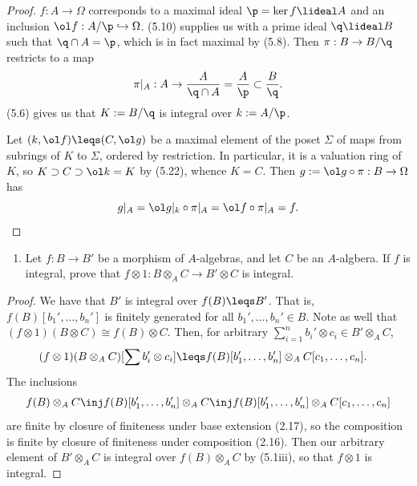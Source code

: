 \documentclass[12pt]{amsart}
\begin{document}
\begin{proof}
  $f:A\to \Omega$ corresponds to a maximal ideal $\p=\ker f\lideal A$ and an inclusion $\ol f:A/\p\hookrightarrow \Omega$.
  (5.10) supplies us with a prime ideal $\q\lideal B$ such that $\q\cap A= \p$, which is in fact maximal by (5.8).
  Then $\pi:B\to B/\q$ restricts to a map 
  \[
    \pi|_A:A\to \frac{A}{\q\cap A}=\frac{A}\p\subset \frac{B}\q.
  \] 
  (5.6) gives us that $K:=B/\q$ is integral over $k:=A/\p$.

  Let $(k,\ol f)\leqs (C,\ol g)$ be a maximal element of the poset $\Sigma$ of maps from subrings of $K$ to $\Sigma$, ordered by restriction.
  In particular, it is a valuation ring of $K$, so $K\supset C\supset \ol k=K$ by (5.22), whence $K=C$.
  Then $g:=\ol g\circ \pi:B\to \Omega$ has 
  \[
    g|_A=\ol g|_k\circ \pi|_A= \ol f\circ \pi|_A=f.
  \]
\end{proof}

\begin{enumerate}
	\item[5.3.] {
      Let $f:B\to B'$ be a morphism of $A$-algebras, and let $C$ be an $A$-algbera.
      If $f$ is integral, prove that $f\otimes 1:B\otimes_A C\to B'\otimes C$ is integral.
    }
\end{enumerate}

\begin{proof}
  We have that $B'$ is integral over $f(B)\leqs B'$.
  That is, $f(B)[b_1',\ldots, b_n']$ is finitely generated for all $b_1',\ldots, b_n'\in B$.
  Note as well that $(f\otimes 1)(B\otimes C)\cong f(B)\otimes C$.
  Then, for arbitrary $\sum_{i=1}^n b_i'\otimes c_i\in B'\otimes_A C$,
  \begin{align*}
    (f\otimes 1)(B\otimes_A C)[\sum b_i'\otimes c_i]
    &\leqs f(B)[b_1',\ldots, b_n']\otimes_A C[c_1,\ldots, c_n].
  \end{align*}
  The inclusions
  \begin{align*}
    f(B)\otimes_A C\inj f(B)[b_1',\ldots, b_n'] \otimes_A C\inj f(B)[b_1',\ldots, b_n']\otimes_A C[c_1,\ldots, c_n]
  \end{align*}
  are finite by closure of finiteness under base extension (2.17), so the composition is finite by closure of finiteness under composition (2.16).
  Then our arbitrary element of $B'\otimes_A C$ is integral over $f(B)\otimes_A C$ by (5.1iii), so that $f\otimes 1$ is integral.
\end{proof}
\end{document}
